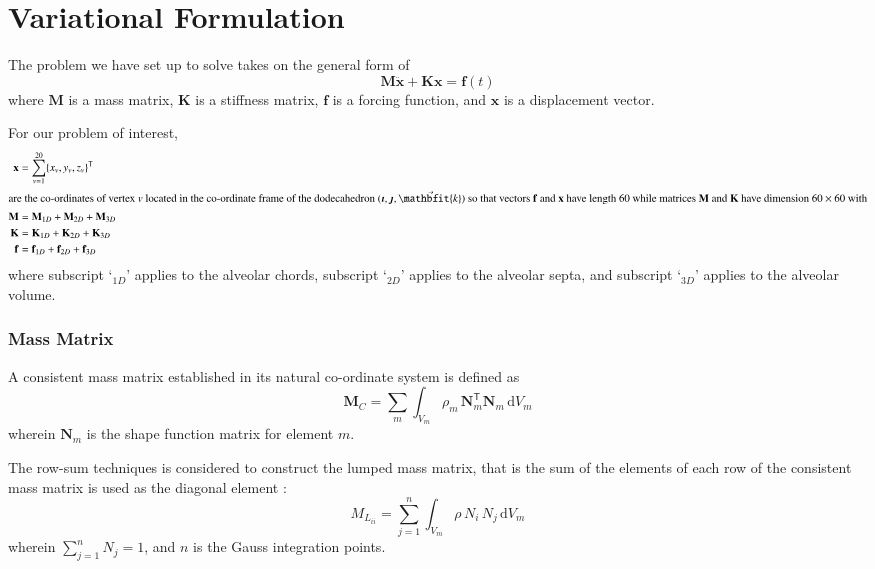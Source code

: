 \setcounter{section}{0}
\part{Variational Formulation}
\label{partVariational}

The problem we have set up to solve takes on the general form of 
\begin{equation}
	\mathbf{M} \ddot{\mathbf{x}} + \mathbf{K} \mathbf{x} = \mathbf{f}(t)
\end{equation}
where $\mathbf{M}$ is a mass matrix, $\mathbf{K}$ is a stiffness matrix, $\mathbf{f}$ is a forcing function, and $\mathbf{x}$ is a displacement vector.  

For our problem of interest, 
\begin{subequations}
\begin{align}
	\mathbf{x} & = \sum_{v=1}^{20} \{ x_v , y_v , z_v \}^{\mathsf{T}} \\
	\intertext{are the co-ordinates of vertex $v$ located in the co-ordinate frame of the dodecahedron $(\boldsymbol{\imath} , \boldsymbol{\jmath} , \vec{\mathbfit{k}} )$ so that vectors $\mathbf{f}$ and $\mathbf{x}$ have length 60 while matrices $\mathbf{M}$ and $\mathbf{K}$ have dimension $60 \times 60$ with}
	\mathbf{M} & = \mathbf{M}_{1D} + \mathbf{M}_{2D} + \mathbf{M}_{3D} \\
	\mathbf{K} & = \mathbf{K}_{1D} + \mathbf{K}_{2D} + \mathbf{K}_{3D} \\
	\mathbf{f} & = \mathbf{f}_{1D} + \mathbf{f}_{2D} + \mathbf{f}_{3D}
\end{align}
\end{subequations}
where subscript `$\mbox{}_{1D}$' applies to the alveolar chords, subscript `$\mbox{}_{2D}$' applies to the alveolar septa, and subscript `$\mbox{}_{3D}$' applies to the alveolar volume.

\section{Mass Matrix}
A consistent mass matrix \cite{Archer65} established in its natural co-ordinate system is defined as
\begin{equation}
	\mathbf{M}_{C} = \sum_m \int_{V_m} \rho_m \, \mathbf{N}_m^{\mathsf{T}} \mathbf{N}_m \,
	\mathrm{d} V_m
	\label{consistentMassMatrix}
\end{equation}
wherein $\mathbf{N}_m$ is the shape function matrix for element $m$.

The row-sum techniques is considered to construct the lumped mass matrix, that is the sum of the elements of each row of the consistent mass matrix is used as the diagonal element \cite{Reddy93}:
\begin{equation}
{M}_{L_{ii}} = \sum_{j=1}^n \int_{V_m} \rho \, N_i \, N_j \, \mathrm{d}  V_m 
\end{equation}
wherein $\sum_{j=1}^n N_j = 1$, and $n$ is the Gauss integration points.

